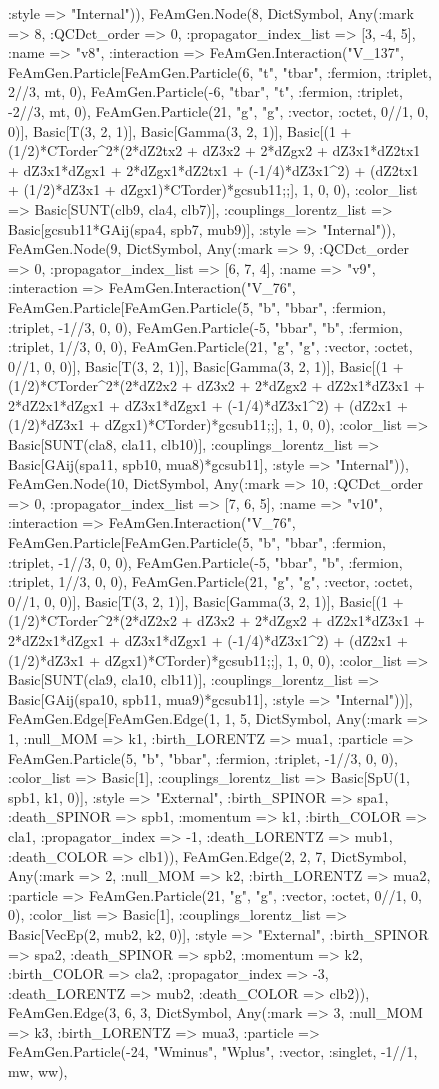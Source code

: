 \documentclass{revtex4}
\begin{document}
\begin{figure}[!htb]
\begin{center}
{:style => "Internal")), FeAmGen.Node(8, Dict{Symbol, Any}(:mark => 8, :QCDct_order => 0, :propagator_index_list => [3, -4, 5], :name => "v8", :interaction => FeAmGen.Interaction("V_137", FeAmGen.Particle[FeAmGen.Particle(6, "t", "tbar", :fermion, :triplet, 2//3, mt, 0), FeAmGen.Particle(-6, "tbar", "t", :fermion, :triplet, -2//3, mt, 0), FeAmGen.Particle(21, "g", "g", :vector, :octet, 0//1, 0, 0)], Basic[T(3, 2, 1)], Basic[Gamma(3, 2, 1)], Basic[(1 + (1/2)*CTorder^2*(2*dZ2tx2 + dZ3x2 + 2*dZgx2 + dZ3x1*dZ2tx1 + dZ3x1*dZgx1 + 2*dZgx1*dZ2tx1 + (-1/4)*dZ3x1^2) + (dZ2tx1 + (1/2)*dZ3x1 + dZgx1)*CTorder)*gcsub11;;], 1, 0, 0), :color_list => Basic[SUNT(clb9, cla4, clb7)], :couplings_lorentz_list => Basic[gcsub11*GAij(spa4, spb7, mub9)], :style => "Internal")), FeAmGen.Node(9, Dict{Symbol, Any}(:mark => 9, :QCDct_order => 0, :propagator_index_list => [6, 7, 4], :name => "v9", :interaction => FeAmGen.Interaction("V_76", FeAmGen.Particle[FeAmGen.Particle(5, "b", "bbar", :fermion, :triplet, -1//3, 0, 0), FeAmGen.Particle(-5, "bbar", "b", :fermion, :triplet, 1//3, 0, 0), FeAmGen.Particle(21, "g", "g", :vector, :octet, 0//1, 0, 0)], Basic[T(3, 2, 1)], Basic[Gamma(3, 2, 1)], Basic[(1 + (1/2)*CTorder^2*(2*dZ2x2 + dZ3x2 + 2*dZgx2 + dZ2x1*dZ3x1 + 2*dZ2x1*dZgx1 + dZ3x1*dZgx1 + (-1/4)*dZ3x1^2) + (dZ2x1 + (1/2)*dZ3x1 + dZgx1)*CTorder)*gcsub11;;], 1, 0, 0), :color_list => Basic[SUNT(cla8, cla11, clb10)], :couplings_lorentz_list => Basic[GAij(spa11, spb10, mua8)*gcsub11], :style => "Internal")), FeAmGen.Node(10, Dict{Symbol, Any}(:mark => 10, :QCDct_order => 0, :propagator_index_list => [7, 6, 5], :name => "v10", :interaction => FeAmGen.Interaction("V_76", FeAmGen.Particle[FeAmGen.Particle(5, "b", "bbar", :fermion, :triplet, -1//3, 0, 0), FeAmGen.Particle(-5, "bbar", "b", :fermion, :triplet, 1//3, 0, 0), FeAmGen.Particle(21, "g", "g", :vector, :octet, 0//1, 0, 0)], Basic[T(3, 2, 1)], Basic[Gamma(3, 2, 1)], Basic[(1 + (1/2)*CTorder^2*(2*dZ2x2 + dZ3x2 + 2*dZgx2 + dZ2x1*dZ3x1 + 2*dZ2x1*dZgx1 + dZ3x1*dZgx1 + (-1/4)*dZ3x1^2) + (dZ2x1 + (1/2)*dZ3x1 + dZgx1)*CTorder)*gcsub11;;], 1, 0, 0), :color_list => Basic[SUNT(cla9, cla10, clb11)], :couplings_lorentz_list => Basic[GAij(spa10, spb11, mua9)*gcsub11], :style => "Internal"))], FeAmGen.Edge[FeAmGen.Edge(1, 1, 5, Dict{Symbol, Any}(:mark => 1, :null_MOM => k1, :birth_LORENTZ => mua1, :particle => FeAmGen.Particle(5, "b", "bbar", :fermion, :triplet, -1//3, 0, 0), :color_list => Basic[1], :couplings_lorentz_list => Basic[SpU(1, spb1, k1, 0)], :style => "External", :birth_SPINOR => spa1, :death_SPINOR => spb1, :momentum => k1, :birth_COLOR => cla1, :propagator_index => -1, :death_LORENTZ => mub1, :death_COLOR => clb1)), FeAmGen.Edge(2, 2, 7, Dict{Symbol, Any}(:mark => 2, :null_MOM => k2, :birth_LORENTZ => mua2, :particle => FeAmGen.Particle(21, "g", "g", :vector, :octet, 0//1, 0, 0), :color_list => Basic[1], :couplings_lorentz_list => Basic[VecEp(2, mub2, k2, 0)], :style => "External", :birth_SPINOR => spa2, :death_SPINOR => spb2, :momentum => k2, :birth_COLOR => cla2, :propagator_index => -3, :death_LORENTZ => mub2, :death_COLOR => clb2)), FeAmGen.Edge(3, 6, 3, Dict{Symbol, Any}(:mark => 3, :null_MOM => k3, :birth_LORENTZ => mua3, :particle => FeAmGen.Particle(-24, "Wminus", "Wplus", :vector, :singlet, -1//1, mw, ww), }
\end{center}
\end{figure}
\end{document}
